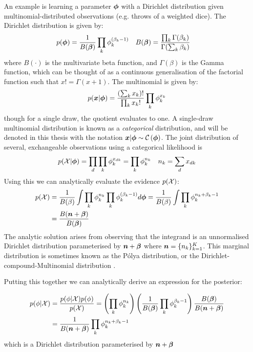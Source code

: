 An example is learning a parameter ${ \bm \phi }$ with a Dirichlet distribution given multinomial-distributed observations (e.g. throws of a weighted dice). The Dirichlet distribution is given by:
\begin{align}
p({ \bm \phi }) & = \frac{1}{ {B(\bm \beta)} } \prod_k \phi_k^{(\beta_k - 1)} &
B(\bm \beta) & = \frac{\prod_k \Gamma(\beta_k)}{\Gamma(\sum_k \beta_k)}
\end{align}
where $B(\cdot)$ is the multivariate beta function, and $\Gamma(\beta)$ is the Gamma function, which can be thought of as a continuous generalisation of the factorial function such that $x! = \Gamma(x+1)$. The multinomial is given by:
\begin{align}
p(\bm x|{ \bm \phi }) = \frac{(\sum_k x_k)!}{\prod_k x_k!} \prod_k \phi_k^{x_k}
\end{align}
though for a single draw, the  quotient evaluates to one. A single-draw multinomial distribution is known as a \emph{categorical} distribution, and will be denoted in this thesis with the notation $\bm x|{ \bm \phi } \sim \mathcal{C} \left( {{ \bm \phi }} \right)$. The joint distribution of several, exchangeable observations using a categorical likelihood is 
\begin{align}
p({ \mathcal{X} }|{ \bm \phi }) & = \prod_d \prod_k \phi_k^{x_{dk}} = \prod_k \phi_k^{n_k} &
n_k = \sum_d x_{dk}
\end{align}
Using this we can analytically evaluate the evidence $p({ \mathcal{X} })$:
\begin{align}
p({ \mathcal{X} }) & = \frac{1}{B(\beta)} \int \prod_k \phi_k^{n_k} \prod_k \phi_k^{(\beta_k - 1)} d{ \bm \phi }  = \frac{1}{B(\beta)} \int \prod_k \phi_k^{n_k + \beta_k - 1} \\
& = \frac{B(\bm n + \bm \beta)}{B(\bm \beta)} \label{eqn:polya-is-evidence}
\end{align}
The analytic solution arises from observing that the integrand is an unnormalised Dirichlet distribution parameterised by $\bm n + \bm \beta$ where $\bm n = \{ n_k \}_{k=1}^K$. This marginal distribution is sometimes known as the P\'{o}lya distribution, or the Dirichlet-compound-Multinomial distribution \cite{Madsen2005}.\label{polya}

Putting this together we can analytically derive an expression for the posterior:

\begin{align}
\begin{split}
p(\phi|{ \mathcal{X} }) 
& = \frac{p(\phi|{ \mathcal{X} })p(\phi)}{p({ \mathcal{X} })}
 = \left(\prod_k \phi_k^{n_k} \right)
   \left(\frac{1}{ {B(\bm \beta)} } \prod_k \phi_k^{\beta_k - 1} \right)
   \frac{B(\bm \beta)}{B(\bm n + \bm \beta)} \\
& = \frac{1}{ {B(\bm n + \bm \beta)} } \prod_k \phi_k^{n_k + \beta_k - 1}
\end{split}
\end{align}
which is a Dirichlet distribution parameterised by $\bm n + \bm \beta$

